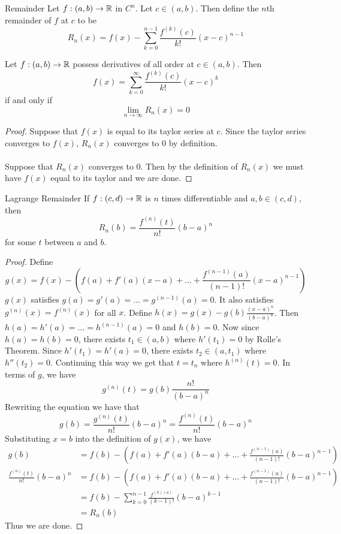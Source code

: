 \documentclass[a4paper]{article}
\begin{document}
\begin{defn}{Remainder}{} Let $f:(a,b)\to\mathbb{R}$ in $C^n$. Let $c\in(a,b)$. Then define the $n$th remainder of $f$ at $c$ to be $$R_n(x)=f(x)-\sum_{k=0}^{n-1}\frac{f^{(k)}(c)}{k!}(x-c)^{n-1}$$
\end{defn}

\begin{thm}{}{} Let $f:(a,b)\to\mathbb{R}$ possess derivatives of all order at $c\in(a,b)$. Then $$f(x)=\sum_{k=0}^{\infty}\frac{f^{(k)}(c)}{k!}(x-c)^k$$ if and only if $$\lim_{n\to\infty}R_n(x)=0$$ \tcbline
\begin{proof}
Suppose that $f(x)$ is equal to its taylor series at $c$. Since the taylor series converges to $f(x)$, $R_n(x)$ converges to $0$ by definition. \\~\\
Suppose that $R_n(x)$ converges to $0$. Then by the definition of $R_n(x)$ we must have $f(x)$ equal to its taylor and we are done. 
\end{proof}
\end{thm}

\begin{thm}{Lagrange Remainder}{} If $f:(c,d)\to\mathbb{R}$ is $n$ times differentiable and $a,b\in(c,d)$, then $$R_n(b)=\frac{f^{(n)}(t)}{n!}(b-a)^n$$ for some $t$ between $a$ and $b$. \tcbline
\begin{proof} Define $$g(x)=f(x)-\left(f(a)+f'(a)(x-a)+\dots+\frac{f^{(n-1)}(a)}{(n-1)!}(x-a)^{n-1}\right)$$ $g(x)$ satisfies $g(a)=g'(a)=\dots=g^{(n-1)}(a)=0$. It also satisfies $g^{(n)}(x)=f^{(n)}(x)$ for all $x$. Define $h(x)=g(x)-g(b)\frac{(x-a)^n}{(b-a)^n}$. Then $h(a)=h'(a)=\dots=h^{(n-1)}(a)=0$ and $h(b)=0$. Now since $h(a)=h(b)=0$, there exists $t_1\in(a,b)$ where $h'(t_1)=0$ by Rolle's Theorem. Since $h'(t_1)=h'(a)=0$, there exists $t_2\in(a,t_1)$ where $h''(t_2)=0$. Continuing this way we get that $t=t_n$ where $h^{(n)}(t)=0$. In terms of $g$, we have $$g^{(n)}(t)=g(b)\frac{n!}{(b-a)^n}$$ Rewriting the equation we have that $$g(b)=\frac{g^{(n)}(t)}{n!}(b-a)^n=\frac{f^{(n)}(t)}{n!}(b-a)^n$$ Substituting $x=b$ into the definition of $g(x)$, we have 
\begin{align*}
g(b)&=f(b)-\left(f(a)+f'(a)(b-a)+\dots+\frac{f^{(n-1)}(a)}{(n-1)!}(b-a)^{n-1}\right)\\
\frac{f^{(n)}(t)}{n!}(b-a)^n&=f(b)-\left(f(a)+f'(a)(b-a)+\dots+\frac{f^{(n-1)}(a)}{(n-1)!}(b-a)^{n-1}\right)\\
&=f(b)-\sum_{k=0}^{n-1}\frac{f^{(k)(a)}}{(k-1)!}(b-a)^{k-1}\\
&=R_n(b)
\end{align*}
Thus we are done. 
\end{proof}
\end{thm}
\end{document}
